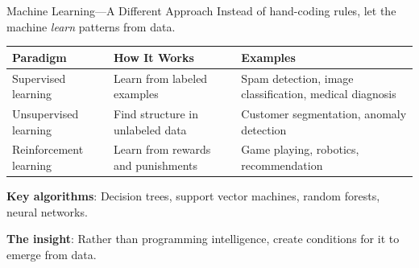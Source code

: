 \documentclass[aspectratio=169,11pt]{beamer}
\begin{document}
\begin{frame}{Machine Learning---A Different Approach}
Instead of hand-coding rules, let the machine \emph{learn} patterns from data.

\vspace{0.2em}
\begin{table}[h]
\centering
\scriptsize
\begin{tabular}{@{}p{2.8cm}p{4.5cm}p{5cm}@{}}
\toprule
\textbf{Paradigm} & \textbf{How It Works} & \textbf{Examples} \\
\midrule
Supervised learning & Learn from labeled examples & Spam detection, image classification, medical diagnosis \\
\addlinespace
Unsupervised learning & Find structure in unlabeled data & Customer segmentation, anomaly detection \\
\addlinespace
Reinforcement learning & Learn from rewards and punishments & Game playing, robotics, recommendation \\
\bottomrule
\end{tabular}
\end{table}

\vspace{0.2em}
\textbf{Key algorithms}: Decision trees, support vector machines, random forests, neural networks.

\vspace{0.2em}
\textbf{The insight}: Rather than programming intelligence, create conditions for it to emerge from data.
\end{frame}
\end{document}
